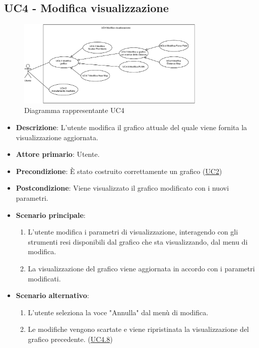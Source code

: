 \subsection{UC4 - Modifica visualizzazione}
\label{sub:uc4}

\begin{figure}[h]
    \centering
    \includegraphics[width=0.8\textwidth]{componenti/casi-duso/diagrammi/UC4.pdf}
    \caption{Diagramma rappresentante UC4}
    \label{fig:UC4}
\end{figure}


\begin{itemize}
    \item \textbf{Descrizione}: L’utente modifica il grafico attuale del quale viene fornita la visualizzazione aggiornata.

    \item \textbf{Attore primario}: Utente.

    \item \textbf{Precondizione}:   È stato costruito correttamente un grafico (\hyperref[sub:uc2]{UC2})

    \item \textbf{Postcondizione}:  Viene visualizzato il grafico modificato con i nuovi parametri.

	\item \textbf{Scenario principale}:
		\begin{enumerate}
            \item L'utente modifica i parametri di visualizzazione, interagendo con gli strumenti resi disponibili dal grafico che sta visualizzando,
                    dal menu di modifica.
            \item La visualizzazione del grafico viene aggiornata in accordo con i parametri modificati.
        \end{enumerate}

    \item \textbf{Scenario alternativo}:
        \begin{enumerate}
            \item L'utente seleziona la voce "Annulla" dal menù di modifica.
            \item Le modifiche vengono scartate e viene ripristinata la visualizzazione del grafico precedente.  (\hyperref[ssub:uc4.8]{UC4.8})
        \end{enumerate}

\end{itemize}

